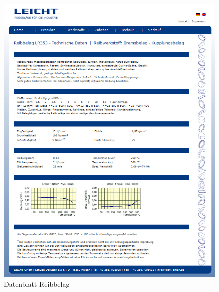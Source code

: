 	\begin{figure}[H]
		\vspace{-2cm}
		\includegraphics[width=1.0773\textwidth,keepaspectratio]{figures/Reibbelag.png}
		\caption{Datenblatt Reibbelag \protect\cite{bib:www:reibbelag}}
		\label{fig:Reibbelag}
	\end{figure}
